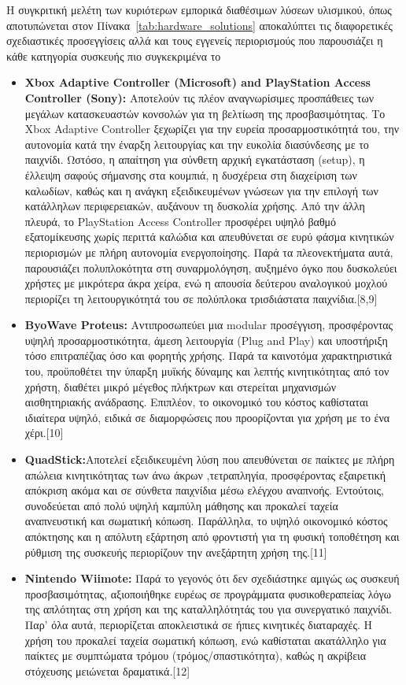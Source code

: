 \documentclass[twoside, a4paper, 11pt]{article}
\begin{document}
Η συγκριτική μελέτη των κυριότερων εμπορικά διαθέσιμων λύσεων υλισμικού, όπως αποτυπώνεται 
στον Πίνακα~\ref{tab:hardware_solutions} αποκαλύπτει τις διαφορετικές σχεδιαστικές προσεγγίσεις αλλά και τους εγγενείς περιορισμούς που παρουσιάζει η κάθε κατηγορία συσκευής πιο συγκεκριμένα το
\begin{itemize}
    \item \textbf{Xbox Adaptive Controller (Microsoft) and PlayStation Access Controller (Sony):} Αποτελούν τις πλέον αναγνωρίσιμες προσπάθειες των μεγάλων κατασκευαστών κονσολών για τη βελτίωση της προσβασιμότητας. 
    Το Xbox Adaptive Controller ξεχωρίζει για την ευρεία προσαρμοστικότητά του, την αυτονομία κατά την έναρξη λειτουργίας και την ευκολία διασύνδεσης με το παιχνίδι. Ωστόσο, η απαίτηση για σύνθετη αρχική εγκατάσταση (setup), η έλλειψη σαφούς σήμανσης στα κουμπιά, η δυσχέρεια στη διαχείριση των καλωδίων, καθώς και η ανάγκη εξειδικευμένων γνώσεων για την επιλογή των κατάλληλων περιφερειακών, αυξάνουν τη δυσκολία χρήσης. 
Από την άλλη πλευρά, το PlayStation Access Controller προσφέρει υψηλό βαθμό εξατομίκευσης χωρίς περιττά καλώδια και απευθύνεται σε ευρύ φάσμα κινητικών περιορισμών με πλήρη αυτονομία ενεργοποίησης. Παρά τα πλεονεκτήματα αυτά, παρουσιάζει πολυπλοκότητα στη συναρμολόγηση, αυξημένο όγκο που δυσκολεύει χρήστες με μικρότερα άκρα χείρα, ενώ η απουσία δεύτερου αναλογικού μοχλού περιορίζει τη λειτουργικότητά του σε πολύπλοκα τρισδιάστατα παιχνίδια.[8,9]
    \item \textbf{ByoWave Proteus:} Αντιπροσωπεύει μια modular προσέγγιση, προσφέροντας υψηλή προσαρμοστικότητα, άμεση λειτουργία (Plug and Play) και υποστήριξη τόσο επιτραπέζιας όσο και φορητής χρήσης. Παρά τα καινοτόμα χαρακτηριστικά του, προϋποθέτει την ύπαρξη μυϊκής δύναμης και λεπτής κινητικότητας από τον χρήστη, διαθέτει μικρό μέγεθος πλήκτρων και στερείται μηχανισμών αισθητηριακής ανάδρασης. Επιπλέον, το οικονομικό του κόστος καθίσταται ιδιαίτερα υψηλό, ειδικά σε διαμορφώσεις που προορίζονται για χρήση με το ένα χέρι.[10]
    \item \textbf{QuadStick:}Αποτελεί εξειδικευμένη λύση που απευθύνεται σε παίκτες με πλήρη απώλεια κινητικότητας των άνω άκρων ,τετραπληγία, προσφέροντας εξαιρετική απόκριση ακόμα και σε σύνθετα παιχνίδια μέσω ελέγχου αναπνοής. Εντούτοις, συνοδεύεται από πολύ υψηλή καμπύλη μάθησης και προκαλεί ταχεία αναπνευστική και σωματική κόπωση. Παράλληλα, το υψηλό οικονομικό κόστος απόκτησης και η απόλυτη εξάρτηση από φροντιστή για τη φυσική τοποθέτηση και ρύθμιση της συσκευής περιορίζουν την ανεξάρτητη χρήση της.[11]
    \item \textbf{Nintendo Wiimote:} Παρά το γεγονός ότι δεν σχεδιάστηκε αμιγώς ως συσκευή προσβασιμότητας, αξιοποιήθηκε ευρέως σε προγράμματα φυσικοθεραπείας λόγω της απλότητας στη χρήση και της καταλληλότητάς του για συνεργατικό παιχνίδι. Παρ' όλα αυτά, περιορίζεται αποκλειστικά σε ήπιες κινητικές διαταραχές. Η χρήση του προκαλεί ταχεία σωματική κόπωση, ενώ καθίσταται ακατάλληλο για παίκτες με συμπτώματα τρόμου (τρόμος/σπαστικότητα), καθώς η ακρίβεια στόχευσης μειώνεται δραματικά.[12]
\end{itemize}
\end{document}
